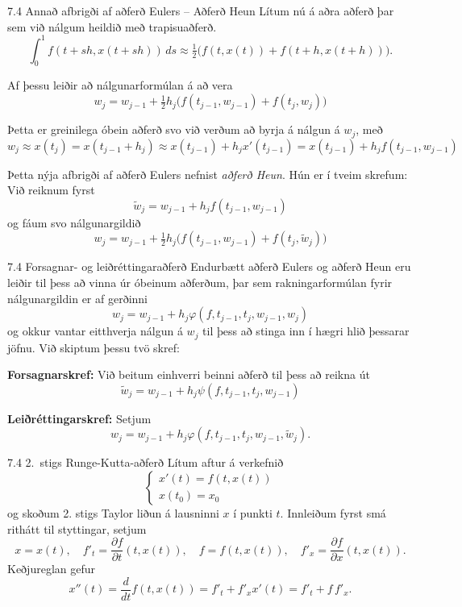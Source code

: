 \begin{frame}{7.4 Annað afbrigði af aðferð Eulers -- Aðferð Heun} 
Lítum nú á aðra aðferð þar sem við nálgum heildið með trapisuaðferð. 
$$
\int_0^1f(t+sh,x(t+sh))\, ds \approx 
\tfrac 12 \big(f(t,x(t))+f(t+h,x(t+h))\big). 
$$

\pause
\smallskip
Af þessu leiðir að nálgunarformúlan á að vera
$$
w_j=w_{j-1}+\tfrac 12h_j\big(f(t_{j-1},w_{j-1})+f(t_j,w_j)\big)
$$

\pause
Þetta er greinilega óbein aðferð svo við verðum að byrja á 
nálgun á $w_j$, með
$$
w_j\approx x(t_j)=x(t_{j-1}+h_j)\approx x(t_{j-1})+h_jx'(t_{j-1})
=x(t_{j-1})+h_jf(t_{j-1},w_{j-1}) 
$$

\smallskip
Þetta nýja afbrigði af aðferð Eulers nefnist {\it aðferð Heun}.
Hún er í tveim skrefum:  Við reiknum fyrst
\begin{equation*}
  \tilde w_j = w_{j-1} + h_jf(t_{j-1},w_{j-1})
\end{equation*}
og fáum svo nálgunargildið
\begin{equation*}
  w_j = w_{j-1} + \tfrac 12h_j
\big(f(t_{j-1},w_{j-1})+f(t_j,\tilde w_j)\big)
\end{equation*}
\end{frame}


\begin{frame}{7.4 Forsagnar- og leiðréttingaraðferð} 
Endurbætt aðferð  Eulers og  aðferð Heun eru leiðir til þess að vinna
úr óbeinum aðferðum, þar sem rakningarformúlan fyrir nálgunargildin er
af gerðinni
$$
w_j=w_{j-1}+h_j\varphi(f,t_{j-1},t_j,w_{j-1},w_j)
$$
og okkur vantar eitthverja nálgun á $w_j$ til þess að stinga inn í
hægri hlið þessarar jöfnu.  Við skiptum þessu tvö skref:

\pause
\smallskip
{\bf Forsagnarskref:}   Við beitum einhverri beinni aðferð til þess að
reikna út 
$$
\tilde w_j=w_{j-1}+h_j\psi(f,t_{j-1},t_j,w_{j-1})
$$

\pause
\smallskip
{\bf Leiðréttingarskref:} Setjum
$$
w_j=w_{j-1}+h_j\varphi(f,t_{j-1},t_j,w_{j-1},\tilde w_j).
$$
\end{frame}


\begin{frame}{7.4 2.~stigs Runge-Kutta-aðferð} 
Lítum aftur á verkefnið
\begin{equation*}
  \left\{
    \begin{array}{l}
      x'(t) = f(t,x(t)) \\
      x(t_0) = x_0
    \end{array}
  \right.
\end{equation*}
og skoðum 2. stigs Taylor liðun á lausninni $x$ í punkti
$t$. Innleiðum fyrst smá rithátt til styttingar, setjum 
\begin{equation*}
  x = x(t), \quad f'_t = \frac{\partial f}{\partial t}(t,x(t)), \quad
  f = f(t,x(t)), \quad f'_x = \frac{\partial f}{\partial x}(t,x(t)).
\end{equation*}
Keðjureglan gefur
$$
x''(t)=\dfrac d{dt}f(t,x(t))=f'_t+f'_xx'(t)=f'_t+f\,f'_x.
$$
\end{frame}



